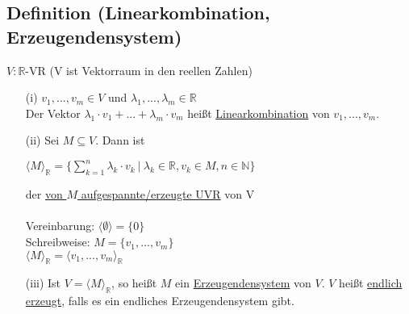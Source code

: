 \documentclass[12pt,titlepage, pdf]{article}
\newcommand{\R}{\mathds{R}}
\newcommand{\uline}[1]{\underline{#1}}
\newcommand*\colvec[1]{
	\global\colveccount#1
	\begin{pmatrix}
		\colvecnext
	}
\def\colvecnext#1{
		#1
		\global\advance\colveccount-1
		\ifnum\colveccount>0
		\\
		\expandafter\colvecnext
		\else
	\end{pmatrix}
	\fi
}
\renewcommand{\>}{\rightarrow}
\renewcommand{\*}{\cdot}
\renewcommand{\vec}[1]{\colvec{#1}}
\begin{document}
\subsection{Definition (Linearkombination, Erzeugendensystem)}
$V: \R$-VR (V ist Vektorraum in den reellen Zahlen) \\
\begin{itemize}
	\item[(i)] $v_1, ... , v_m \in V$ und $\lambda_1,...,\lambda_m \in \R$\\ Der Vektor $\lambda_1 \* v_1 + ... + \lambda_m \* v_m$ heißt \uline{Linearkombination} von $v_1,...,v_m$.
	\item[(ii)] Sei $M \subseteq V$. Dann ist
	      \begin{center}
	      	$\langle M \rangle_{\R} = \big\{ \sum_{k = 1}^{n} \lambda_k \cdot v_k~ \big|~ \lambda_k \in \R, v_k \in M, n \in \mathds{N}\big\}$
	      \end{center}
	      der \underline{von $M$ aufgespannte/erzeugte UVR} von V \\
	      \\
	      Vereinbarung: $\langle \emptyset \rangle = \{0\}$\\
	      Schreibweise: $M = \{v_1,...,v_m\}$\\
	      \noindent\hspace*{22mm}$\langle M \rangle_{\R} = \langle v_1,..., v_m\rangle_{\R} $
	\item[(iii)]
	      Ist $V = \langle M \rangle_{\R}$, so heißt $M$ ein \uline{Erzeugendensystem} von $V$. $V$ heißt \uline{endlich erzeugt}, falls es ein endliches Erzeugendensystem gibt.
\end{itemize}
\end{document}
